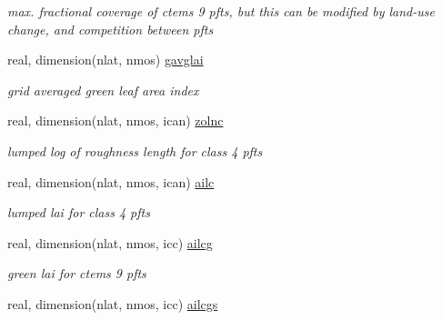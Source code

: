 \begin{DoxyCompactItemize}
\begin{DoxyCompactList}\small\item\em max. fractional coverage of ctem\textquotesingle{}s 9 pfts, but this can be modified by land-\/use change, and competition between pfts \end{DoxyCompactList}\item 
\hypertarget{structctem__statevars_1_1veg__rot_abb3a96603cb173c014eb7ce8597beecf}{}real, dimension(nlat, nmos) \hyperlink{structctem__statevars_1_1veg__rot_abb3a96603cb173c014eb7ce8597beecf}{gavglai}\label{structctem__statevars_1_1veg__rot_abb3a96603cb173c014eb7ce8597beecf}

\begin{DoxyCompactList}\small\item\em grid averaged green leaf area index \end{DoxyCompactList}\item 
\hypertarget{structctem__statevars_1_1veg__rot_a47c82b8aaae46847895dbacbf9215ea2}{}real, dimension(nlat, nmos, ican) \hyperlink{structctem__statevars_1_1veg__rot_a47c82b8aaae46847895dbacbf9215ea2}{zolnc}\label{structctem__statevars_1_1veg__rot_a47c82b8aaae46847895dbacbf9215ea2}

\begin{DoxyCompactList}\small\item\em lumped log of roughness length for class\textquotesingle{} 4 pfts \end{DoxyCompactList}\item 
\hypertarget{structctem__statevars_1_1veg__rot_a7a34c0dd206d309548c2723f0c9fe8ca}{}real, dimension(nlat, nmos, ican) \hyperlink{structctem__statevars_1_1veg__rot_a7a34c0dd206d309548c2723f0c9fe8ca}{ailc}\label{structctem__statevars_1_1veg__rot_a7a34c0dd206d309548c2723f0c9fe8ca}

\begin{DoxyCompactList}\small\item\em lumped lai for class\textquotesingle{} 4 pfts \end{DoxyCompactList}\item 
\hypertarget{structctem__statevars_1_1veg__rot_a3b0d3958712d41f2a6c9713b2d3d02b1}{}real, dimension(nlat, nmos, icc) \hyperlink{structctem__statevars_1_1veg__rot_a3b0d3958712d41f2a6c9713b2d3d02b1}{ailcg}\label{structctem__statevars_1_1veg__rot_a3b0d3958712d41f2a6c9713b2d3d02b1}

\begin{DoxyCompactList}\small\item\em green lai for ctem\textquotesingle{}s 9 pfts \end{DoxyCompactList}\item 
\hypertarget{structctem__statevars_1_1veg__rot_a984b7a15c7fbdd0a18408c4a048f9f8b}{}real, dimension(nlat, nmos, icc) \hyperlink{structctem__statevars_1_1veg__rot_a984b7a15c7fbdd0a18408c4a048f9f8b}{ailcgs}\label{structctem__statevars_1_1veg__rot_a984b7a15c7fbdd0a18408c4a048f9f8b}


\end{DoxyCompactItemize}
